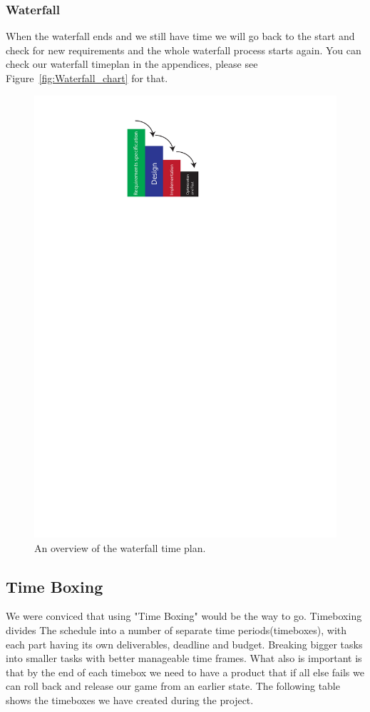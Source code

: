\subsubsection{Waterfall}
When the waterfall ends and we still have time
we will go back to the start and check for new requirements
and the whole waterfall process starts again. You can check our waterfall
timeplan in the appendices, please
see Figure~\ref{fig:Waterfall_chart} for that.

\begin{figure}[h]
  \centering
  \includegraphics[scale=0.6]{Figures/Waterfall}
  \caption{An overview of the waterfall time plan.}
\label{fig:Waterfall}
\end{figure}
\subsection{Time Boxing} %
We were conviced that using "Time Boxing" would be the way to go.
Timeboxing divides The schedule into a number of separate time periods(timeboxes), with each part having its own deliverables, deadline and budget.
Breaking bigger tasks into smaller tasks with better manageable time frames.
What also is important is that by the end of each timebox we need to have a product that if all else fails we can roll back and release our game from an earlier state. The following table shows the timeboxes we have created during the project.

